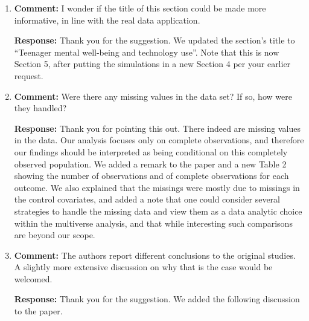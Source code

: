 \documentclass[11pt, a4paper]{article}
\newcommand{\reply}{\vspace{0.3cm} \noindent \textbf{Response:} {\it }}
\begin{document}
\begin{enumerate}[leftmargin=*]
\item \textbf{Comment:} I wonder if the title of this section could be made more informative, in line with the real data application.

\reply Thank you for the suggestion. We updated the section's title to ``Teenager mental well-being and technology use''. Note that this is now Section 5, after putting the simulations in a new Section 4 per your earlier request.

\vspace{0.5cm}

    \item \textbf{Comment:} Were there any missing values in the data set? If so, how were they handled?

    \reply Thank you for pointing this out. There indeed are missing values in the data. Our analysis focuses only on complete observations, and therefore our findings should be interpreted as being conditional on this completely observed population. We added a remark to the paper and a new Table 2 showing the number of observations and of complete observations for each outcome. We also explained that the missings were mostly due to missings in the control covariates,
and added a note that one could consider several strategies to handle the missing data and view them as a data analytic choice within the multiverse analysis, and that while interesting such comparisons are beyond our scope.



    \vspace{0.5cm}

    \item \textbf{Comment:} The authors report different conclusions to the original studies. A slightly more extensive discussion on why that is the case would be welcomed.

    \reply Thank you for the suggestion. We added the following discussion to the paper.


\end{enumerate}
\end{document}
